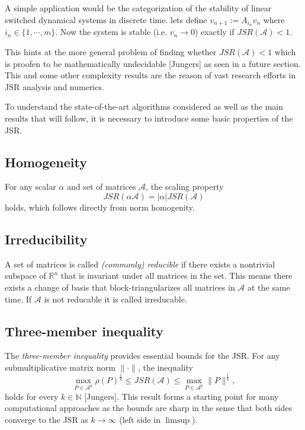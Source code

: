 A simple application would be the categorization of the stability of linear switched dynamical systems in discrete time. 
lets define $v_{n+1} := A_{i_n}v_{n}$ where $i_n \in \{1, \cdots , m\}$. Now the system is stable (i.e. $v_n \rightarrow 0$) exactly if $JSR(\mathcal{A}) < 1$.

This hints at the more general problem of finding whether $JSR(\mathcal{A}) < 1$ which is proofen to be mathematically undecidable [Jungers] as seen in a future section. This and some other complexity results are the reason of vast research efforts in JSR analysis and numerics. 

To understand the state-of-the-art algorithms considered as well as the main results that will follow, it is necessary to introduce some basic properties of the JSR.

\subsection*{Homogeneity}
For any scalar $\alpha$ and set of matrices $\mathcal{A}$, the scaling property
\begin{equation}
    JSR(\alpha \mathcal{A}) = |\alpha| JSR(\mathcal{A})
\end{equation}
holds, which follows directly from norm homogenity. 

\subsection*{Irreducibility}
A set of matrices is called \emph{(commonly) reducible} if there exists a nontrivial subspace of $\mathbb{R}^n$ that is invariant under all matrices in the set. This means there exists a change of basis that block-triangularizes all matrices in $\mathcal{A}$ at the same time. If $\mathcal{A}$ is not reducable it is called irreducable. 

\subsection*{Three-member inequality}
The \emph{three-member inequality} provides essential bounds for the JSR. For any submultiplicative matrix norm $\|\cdot\|$, the inequality
\begin{equation}
    \max_{P \in \mathcal{A}^k} \rho(P)^{\frac{1}{k}} \leq JSR(\mathcal{A}) \leq \max_{P \in \mathcal{A}^k} \| P\|^{\frac{1}{k}},
    \label{eq:three-member}
\end{equation}
holds for every $k \in \mathbb{N}$ [Jungers]. This result forms a starting point for many computational approaches as the bounds are sharp in the sense that both sides converge to the JSR as $k\rightarrow \infty$ (left side in $\limsup$).

